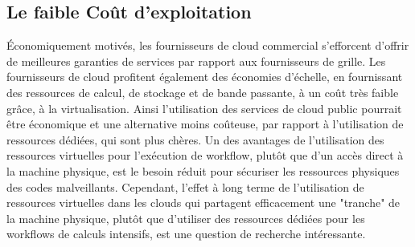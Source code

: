 \subsection{Le faible Coût d’exploitation }
 Économiquement motivés, les fournisseurs de cloud commercial s'efforcent d'offrir de meilleures garanties de services par rapport aux fournisseurs de grille. Les fournisseurs de cloud profitent également des économies d'échelle, en fournissant des ressources de calcul, de stockage et de bande passante, à un coût très faible grâce, à la virtualisation. Ainsi l'utilisation des services de cloud public pourrait être économique et une alternative moins coûteuse, par rapport à l’utilisation de ressources dédiées, qui sont plus chères. Un des avantages de l'utilisation des ressources virtuelles pour l'exécution de workflow, plutôt que d'un accès direct à la machine physique, est le besoin réduit pour sécuriser les ressources physiques des codes malveillants. Cependant, l'effet à long terme de l'utilisation de ressources virtuelles dans les clouds qui partagent efficacement une "tranche" de la machine physique, plutôt que d'utiliser des ressources dédiées pour les workflows de calculs intensifs, est une question de recherche intéressante.
